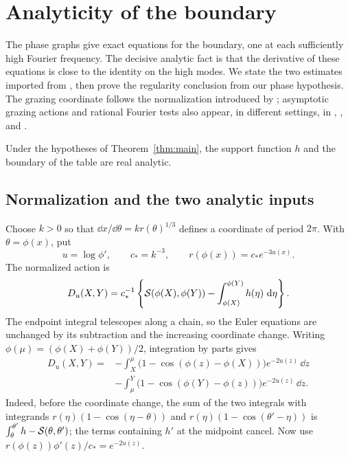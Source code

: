 \section{Analyticity of the boundary}\label{sec:analytic}

The phase graphs give exact equations for the boundary, one at each
sufficiently high Fourier frequency.  The decisive analytic fact is
that the derivative of these equations is close to the identity on
the high modes.  We state the two estimates imported from
\cite[Lemma~2.3 and Proposition~2.4]{NB}, then prove the regularity
conclusion from our phase hypothesis. The grazing coordinate follows
the normalization introduced by \citet{Lazutkin1973}; asymptotic grazing
actions and rational Fourier tests also appear, in different settings,
in \citet{MarviziMelrose1982}, \citet{RamirezRos2006}, and \citet{ADK2016}.

\begin{theorem}\label{thm:analytic-boundary}
Under the hypotheses of Theorem~\ref{thm:main}, the support function
\(h\) and the boundary of the table are real analytic.
\end{theorem}

\subsection{Normalization and the two analytic inputs}

Choose \(k>0\) so that \(\dd x/\dd\theta=k r(\theta)^{1/3}\)
defines a coordinate of period \(2\pi\).  With \(\theta=\phi(x)\), put
\begin{equation}\label{ana:normalization}
 u=\log\phi',\qquad c_*=k^{-3},\qquad
 r(\phi(x))=c_*e^{-3u(x)}.
\end{equation}
The normalized action is
\[
 D_u(X,Y)=c_*^{-1}\left\{
 \mathcal{S}(\phi(X),\phi(Y))-
 \int_{\phi(X)}^{\phi(Y)}h(\eta)\,\mathop{}\!\mathrm{d}\eta\right\}.
\]
The endpoint integral telescopes along a chain, so the Euler equations
are unchanged by its subtraction and the increasing coordinate change.
Writing \(\phi(\mu)=(\phi(X)+\phi(Y))/2\), integration by parts gives
\begin{equation}\label{eq:normalized-action}
\begin{split}
D_u(X,Y)={}&-\int_X^\mu
 \bigl(1-\cos(\phi(z)-\phi(X))\bigr)e^{-2u(z)}\,\dd z\\
 &-\int_\mu^Y
 \bigl(1-\cos(\phi(Y)-\phi(z))\bigr)e^{-2u(z)}\,\dd z.
\end{split}
\end{equation}
Indeed, before the coordinate change, the sum of the two integrals
with integrands \(r(\eta)(1-\cos(\eta-\theta))\) and
\(r(\eta)(1-\cos(\theta'-\eta))\) is
\(\int_\theta^{\theta'}h-\mathcal{S}(\theta,\theta')\); the terms containing
\(h'\) at the midpoint cancel.  Now use
\(r(\phi(z))\phi'(z)/c_*=e^{-2u(z)}\).

